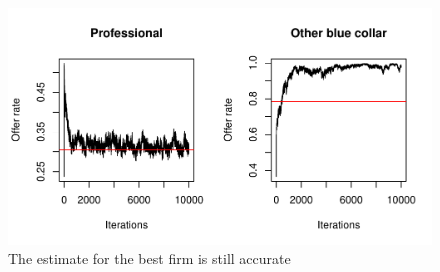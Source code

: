 \begin{figure}[tbp]
  \centering
  \includegraphics[width=\textwidth,keepaspectratio]{../figure/sim_labor_nojobs_nounemp_offer_rate}
  \caption{The estimate for the best firm is still accurate}
  \label{fig:sim_labor_nojobs_nounemp_offer_rate}
\end{figure}


